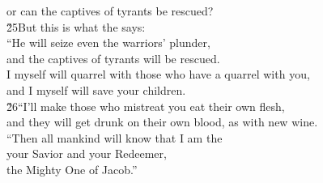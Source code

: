 \begin{poetry}
\poemll    or can the captives of tyrants be rescued? \\
\poeml \v{25}But this is what the  says: \\
\poeml ``He will seize even the warriors' plunder, \\
\poemll    and the captives of tyrants will be rescued. \\
\poeml I myself will quarrel with those who have a quarrel with you, \\
\poemll    and I myself will save your children. \\
\poeml \v{26}``I'll make those who mistreat you eat their own flesh, \\
\poemll    and they will get drunk on their own blood, as with new wine. \\
\poeml ``Then all mankind will know that I am the  \\
\poemll    your Savior and your Redeemer, \\
\poemlll       the Mighty One of Jacob.''
\end{poetry}

